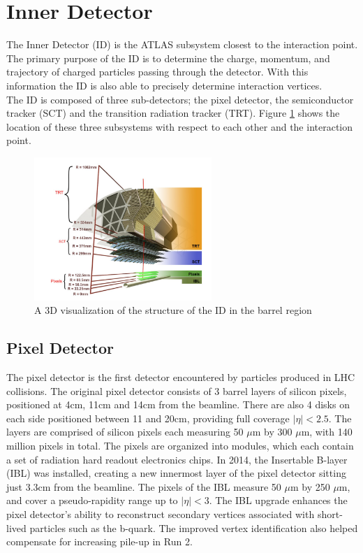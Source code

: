 \section{Inner Detector}

The Inner Detector (ID) is the ATLAS subsystem closest to the interaction point. The primary purpose of the ID is to determine the charge, momentum, and trajectory of charged particles passing through the detector. With this information the ID is also able to precisely determine interaction vertices. \\

The ID is composed of three sub-detectors; the pixel detector, the semiconductor tracker (SCT) and the transition radiation tracker (TRT). Figure \ref{fig:innerDetector} shows the location of these three subsystems with respect to each other and the interaction point. 

\begin{figure}
        \centering
	\includegraphics[width=0.6\textwidth]{figures/ch3/innerDetector.png}
	\caption{A 3D visualization of the structure of the ID in the barrel region \cite{innerDet}}
	\label{fig:innerDetector}
\end{figure}

\subsection{Pixel Detector}
The pixel detector is the first detector encountered by particles produced in LHC collisions. The original pixel detector consists of 3 barrel layers of silicon pixels, positioned at 4cm, 11cm and 14cm from the beamline. There are also 4 disks on each side positioned between 11 and 20cm, providing full coverage $|\eta| < 2.5$. The layers are comprised of silicon pixels each measuring 50 $\mu$m by 300 $\mu$m, with 140 million pixels in total. The pixels are organized into modules, which each contain a set of radiation hard readout electronics chips. In 2014, the Insertable B-layer (IBL) was installed, creating a new innermost layer of the pixel detector sitting just 3.3cm from the beamline. The pixels of the IBL measure 50 $\mu$m by 250 $\mu$m, and cover a pseudo-rapidity range up to $|\eta| < 3$. The IBL upgrade enhances the pixel detector's ability to reconstruct secondary vertices associated with short-lived particles such as the b-quark. The improved vertex identification also helped compensate for increasing pile-up in Run 2. 

